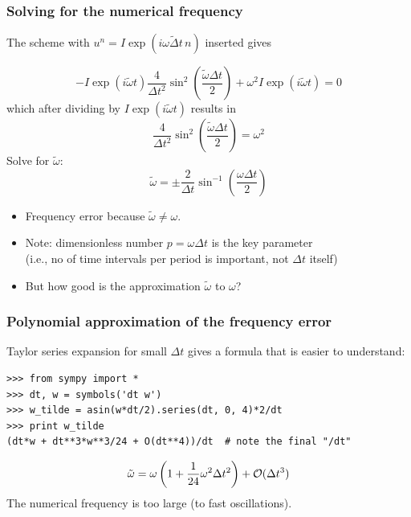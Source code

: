 \documentclass{beamer}
\begin{document}
\begin{frame}
\frametitle{Solving for the numerical frequency}

The scheme
with $u^n=I\exp{(i\omega\tilde\Delta t\, n)}$ inserted gives

\[
-I\exp{(i\tilde\omega t)}\frac{4}{\Delta t^2}\sin^2(\frac{\tilde\omega\Delta t}{2})
+ \omega^2 I\exp{(i\tilde\omega t)} = 0
\]
which after dividing by $I\exp{(i\tilde\omega t)}$ results in
\[
\frac{4}{\Delta t^2}\sin^2(\frac{\tilde\omega\Delta t}{2}) = \omega^2
\]
Solve for $\tilde\omega$:
\[
\tilde\omega = \pm \frac{2}{\Delta t}\sin^{-1}\left(\frac{\omega\Delta t}{2}\right)
\]

\begin{itemize}
 \item Frequency error because $\tilde\omega \neq \omega$.

 \item Note: dimensionless number $p=\omega\Delta t$ is the key parameter \\
   (i.e., no of time intervals per period is important, not $\Delta t$ itself)

 \item But how good is the approximation $\tilde\omega$ to $\omega$?
\end{itemize}

\noindent
\end{frame}

\begin{frame}
\frametitle{Polynomial approximation of the frequency error}

Taylor series expansion
for small $\Delta t$ gives a formula that is easier to understand:

\begin{verbatim}
>>> from sympy import *
>>> dt, w = symbols('dt w')
>>> w_tilde = asin(w*dt/2).series(dt, 0, 4)*2/dt
>>> print w_tilde
(dt*w + dt**3*w**3/24 + O(dt**4))/dt  # note the final "/dt"
\end{verbatim}

\[
\tilde\omega = \omega\left( 1 + \frac{1}{24}\omega^2\Delta t^2\right) + {\cal O}(\Delta t^3)
\]
The numerical frequency is too large (to fast oscillations).
\end{frame}
\end{document}
